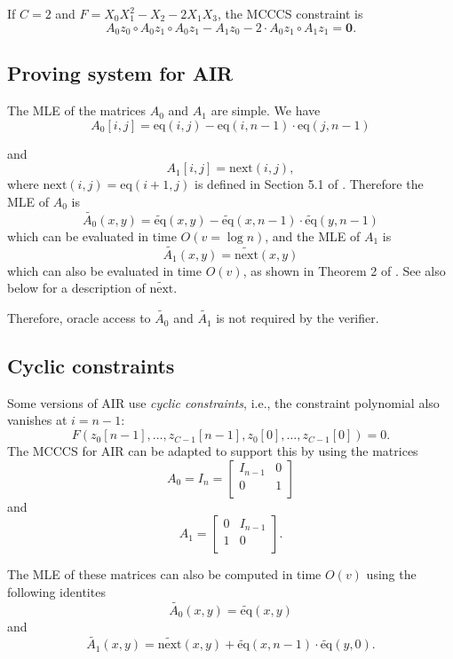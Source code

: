\documentclass[a4paper]{article}
\begin{document}
If $C=2$ and $F = X_0 X_1^2 - X_2 - 2X_1X_3$, the MCCCS constraint is
$$
A_0 z_0 \circ A_0z_1 \circ A_0z_1 - A_1 z_0 -2\cdot A_0 z_1 \circ A_1z_1 = \mathbf{0}. 
$$

\subsection*{Proving system for AIR}
The MLE of the matrices $A_0$ and $A_1$ are simple. We have 
$$A_0[i,j] = \text{eq}(i,j)-\text{eq}(i,n-1)\cdot \text{eq}(j,n-1)$$

and 
$$A_1[i,j]=\text{next}(i,j),$$ where $\text{next}(i,j)=\text{eq}(i+1,j)$ is defined in Section 5.1 of \cite{cryptoeprint:2023/552}. Therefore the MLE of $A_0$ is 
$$\widetilde{A_0}(x,y) = \widetilde{\text{eq}}(x,y)-\widetilde{\text{eq}}(x,n-1)\cdot \widetilde{\text{eq}}(y,n-1)$$
which can be evaluated in time $O(v=\log n)$, and the MLE of $A_1$ is
$$\widetilde{A_1}(x,y) = \widetilde{\text{next}}(x,y)$$
which can also be evaluated in time $O(v)$, as shown in Theorem 2 of \cite{cryptoeprint:2023/552}. See also below for a description of $\widetilde{\text{next}}$.

Therefore, oracle access to $\widetilde{A_0}$ and $\widetilde{A_1}$ is not required by the verifier.

\subsection*{Cyclic constraints}

Some versions of AIR use \emph{cyclic constraints}, i.e., the constraint polynomial also vanishes at $i=n-1$:
$$
F(z_0[n-1],\dots,z_{C-1}[n-1],z_0[0],\dots,z_{C-1}[0])=0.
$$
The MCCCS for AIR can be adapted to support this by using the matrices 
$$ A_0 = I_n =
\begin{bmatrix}
I_{n-1} & 0 \\
0 & 1      \\
\end{bmatrix}
$$
and
$$
A_1 = 
\begin{bmatrix}
0 & I_{n-1} \\
1 & 0      \\
\end{bmatrix}.
$$

The MLE of these matrices can also be computed in time $O(v)$ using the following identites
$$ \widetilde{A_0}(x,y) = \widetilde{\text{eq}}(x,y) $$
and
$$\widetilde{A_1}(x,y) = \widetilde{\text{next}}(x,y) + \widetilde{\text{eq}}(x,n-1)\cdot \widetilde{\text{eq}}(y,0).$$
\end{document}
